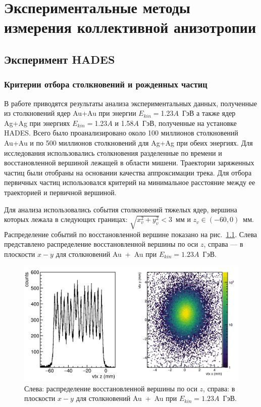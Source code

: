 \chapter{Экспериментальные методы измерения коллективной анизотропии}

\section{Эксперимент HADES}

\subsection{Критерии отбора столкновений и рожденных частиц}

В работе приводятся результаты анализа экспериментальных данных, полученные из столкновений ядер Au+Au при энергии $E_{kin}=$1.23$A$~ГэВ а также ядер Ag+Ag при энергиях $E_{kin}=$1.23$A$ и 1.58$A$~ГэВ, полученные на установке HADES.
Всего было проанализировано около 100 миллионов столкновений Au+Au и по 500 миллионов столкновений для Ag+Ag при обеих энергиях.
Для исследования использовались столкновения разделенные по времени и восстановленной вершиной лежащей в области мишени.
Траектории заряженных частиц были отобраны на основании качества аппроксимации трека.
Для отбора первичных частиц использовался критерий на минимальное расстояние между ее траекторией и первичной вершиной. 

Для анализа использовались события столкновений тяжелых ядер, вершина которых лежала в следующих границах: $\sqrt{x_v^2+y_v^2}<3$~мм и $z_v \in (-60, 0)$~мм.
Распределение событий по восстановленной вершине показано на рис.~\ref{fig:hades_vertex}.
Слева представлено распределение восстановленной вершины по оси $z$, справа --- в плоскости $x-y$ для столкновений Au~+~Au при $E_{kin}=1.23A$~ГэВ.
\begin{figure}[ht]
    \begin{center}
        \includegraphics[width=0.95\linewidth]{images/hades_vertex.png}
        \caption{Слева: распределение восстановленной вершины по оси $z$, справа: в плоскости $x-y$ для столкновений Au~+~Au при $E_{kin}=1.23A$~ГэВ.}
        \label{fig:hades_vertex}
    \end{center}
\end{figure}

